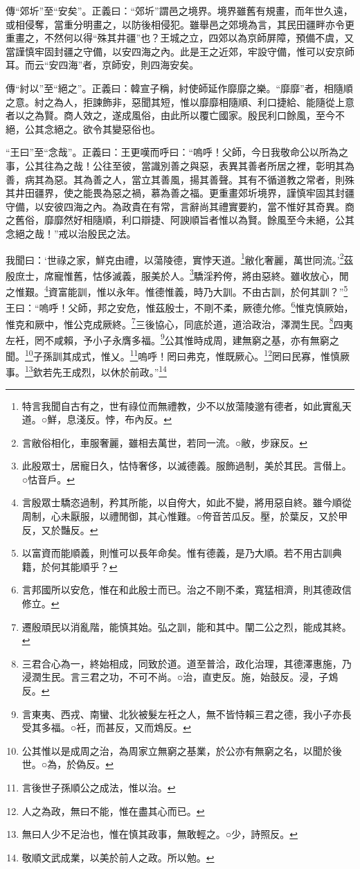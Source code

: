 {\noindent\zhuan{}\fzbyks 傳“郊圻”至“安矣”。正義曰：“郊圻”謂邑之境界。境界雖舊有規畫，而年世久遠，或相侵奪，當重分明畫之，以防後相侵犯。雖舉邑之郊境為言，其民田疆畔亦令更重畫之，不然何以得“殊其井疆”也？王城之立，四郊以為京師屏障，預備不虞，又當謹慎牢固封疆之守備，以安四海之內。此是王之近郊，牢設守備，惟可以安京師耳。而云“安四海”者，京師安，則四海安矣。 \par}

{\noindent\zhuan{}\fzbyks 傳“紂以”至“絕之”。正義曰：韓宣子稱，紂使師延作靡靡之樂。“靡靡”者，相隨順之意。紂之為人，拒諫飾非，惡聞其短，惟以靡靡相隨順、利口捷給、能隨從上意者以之為賢。商人效之，遂成風俗，由此所以覆亡國家。殷民利口餘風，至今不絕，公其念絕之。欲令其變惡俗也。 \par}

{\noindent\shu{}\fzkt “王曰”至“念哉”。正義曰：王更嘆而呼曰：“嗚呼！父師，今日我敬命公以所為之事，公其往為之哉！公往至彼，當識別善之與惡，表異其善者所居之裡，彰明其為善，病其為惡。其為善之人，當立其善風，揚其善聲。其有不循道教之常者，則殊其井田疆界，使之能畏為惡之禍，慕為善之福。更重畫郊圻境界，謹慎牢固其封疆守備，以安彼四海之內。為政貴在有常，言辭尚其禮實要約，當不惟好其奇異。商之舊俗，靡靡然好相隨順，利口辯捷、阿諛順旨者惟以為賢。餘風至今未絕，公其念絕之哉！”戒以治殷民之法。 \par}

我聞曰：‘世祿之家，鮮克由禮，以蕩陵德，實悖天道。\footnote{特言我聞自古有之，世有祿位而無禮教，少不以放蕩陵邈有德者，如此實亂天道。○鮮，息淺反。悖，布內反。}敝化奢麗，萬世同流。’\footnote{言敝俗相化，車服奢麗，雖相去萬世，若同一流。○敝，步寐反。}茲殷庶士，席寵惟舊，怙侈滅義，服美於人。\footnote{此殷眾士，居寵日久，怙恃奢侈，以滅德義。服飾過制，美於其民。言僣上。○怙音戶。}驕淫矜侉，將由惡終。雖收放心，閒之惟艱。\footnote{言殷眾士驕恣過制，矜其所能，以自侉大，如此不變，將用惡自終。雖今順從周制，心未厭服，以禮閒御，其心惟難。○侉音苦瓜反。壓，於葉反，又於甲反，又於豔反。}資富能訓，惟以永年。惟德惟義，時乃大訓。不由古訓，於何其訓？”\footnote{以富資而能順義，則惟可以長年命矣。惟有德義，是乃大順。若不用古訓典籍，於何其能順乎？}王曰：“嗚呼！父師，邦之安危，惟茲殷士，不剛不柔，厥德允修。\footnote{言邦國所以安危，惟在和此殷士而已。治之不剛不柔，寬猛相濟，則其德政信修立。}惟克慎厥始，惟克和厥中，惟公克成厥終。\footnote{遷殷頑民以消亂階，能慎其始。弘之訓，能和其中。闡二公之烈，能成其終。}三後協心，同底於道，道洽政治，澤潤生民。\footnote{三君合心為一，終始相成，同致於道。道至普洽，政化治理，其德澤惠施，乃浸潤生民。言三君之功，不可不尚。○治，直吏反。施，始鼓反。浸，子鴆反。}四夷左衽，罔不咸賴，予小子永膺多福。\footnote{言東夷、西戎、南蠻、北狄被髮左衽之人，無不皆恃賴三君之德，我小子亦長受其多福。○衽，而甚反，又而鴆反。}公其惟時成周，建無窮之基，亦有無窮之聞。\footnote{公其惟以是成周之治，為周家立無窮之基業，於公亦有無窮之名，以聞於後世。○為，於偽反。}子孫訓其成式，惟乂。\footnote{言後世子孫順公之成法，惟以治。}嗚呼！罔曰弗克，惟既厥心。\footnote{人之為政，無曰不能，惟在盡其心而已。}罔曰民寡，惟慎厥事。\footnote{無曰人少不足治也，惟在慎其政事，無敢輕之。○少，詩照反。}欽若先王成烈，以休於前政。”\footnote{敬順文武成業，以美於前人之政。所以勉。}


